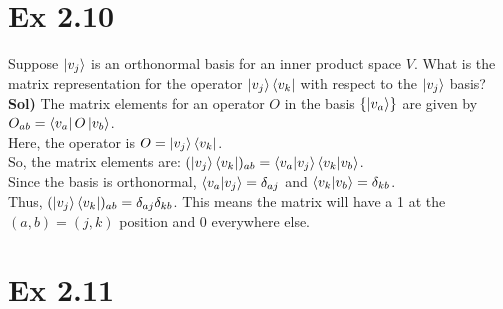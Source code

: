 \documentclass{article}
\newcommand{\0}{{$|0\rangle$}}
\newcommand{\1}{{$|1\rangle$}}
\begin{document}
\newpage

\section*{Ex 2.10}

Suppose $\ket{v_j}$ is an orthonormal basis for an inner product space $V$. What is the matrix representation for the operator $\ket{v_j}\bra{v_k}$ with respect to the $\ket{v_j}$ basis? \\
\textbf{Sol)} The matrix elements for an operator $O$ in the basis $\{\ket{v_a}\}$ are given by $O_{ab} = \bra{v_a} O \ket{v_b}$. \\
Here, the operator is $O = \ket{v_j}\bra{v_k}$. \\
So, the matrix elements are: $(\ket{v_j}\bra{v_k})_{ab} = \bra{v_a} \ket{v_j}\bra{v_k} \ket{v_b}$. \\
Since the basis is orthonormal, $\bra{v_a}\ket{v_j} = \delta_{aj}$ and $\bra{v_k}\ket{v_b} = \delta_{kb}$. \\
Thus, $(\ket{v_j}\bra{v_k})_{ab} = \delta_{aj} \delta_{kb}$.
This means the matrix will have a 1 at the $(a,b) = (j,k)$ position and 0 everywhere else.

\newpage

\section*{Ex 2.11}
\end{document}
